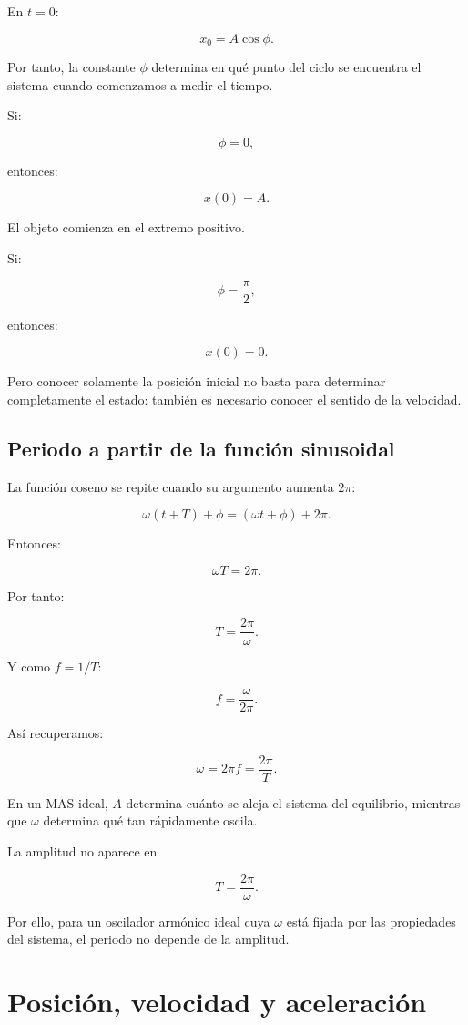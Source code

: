 En \(t=0\):

\[ x_0=A\cos\phi. \]

Por tanto, la constante \(\phi\) determina en qué punto del ciclo se encuentra el sistema cuando comenzamos a medir el tiempo.

Si:

\[ \phi=0, \]

entonces:

\[ x(0)=A. \]

El objeto comienza en el extremo positivo.

Si:

\[ \phi=\frac{\pi}{2}, \]

entonces:

\[ x(0)=0. \]

Pero conocer solamente la posición inicial no basta para determinar completamente el estado: también es necesario conocer el sentido de la velocidad.

\subsection{Periodo a partir de la función sinusoidal}

La función coseno se repite cuando su argumento aumenta \(2\pi\):

\[ \omega(t+T)+\phi=(\omega t+\phi)+2\pi. \]

Entonces:

\[ \omega T=2\pi. \]

Por tanto:

\[ \boxed{T=\frac{2\pi}{\omega}}. \]

Y como \(f=1/T\):

\[ \boxed{f=\frac{\omega}{2\pi}}. \]

Así recuperamos:

\[ \boxed{\omega=2\pi f=\frac{2\pi}{T}}. \]

\begin{interpretacion}
En un MAS ideal, \(A\) determina cuánto se aleja el sistema del equilibrio, mientras que \(\omega\) determina qué tan rápidamente oscila.

La amplitud no aparece en

\[ T=\frac{2\pi}{\omega}. \]

Por ello, para un oscilador armónico ideal cuya \(\omega\) está fijada por las propiedades del sistema, el periodo no depende de la amplitud.
\end{interpretacion}

\section{Posición, velocidad y aceleración}

